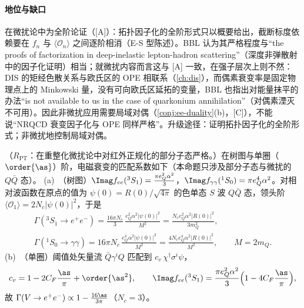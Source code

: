 \paragraph{地位与缺口}
在微扰论中为全阶论证（[A]）：拓扑因子化的全阶形式只以概要给出，截断标度依赖要在 $f_n$ 与 $\langle\mathcal O_n\rangle$ 之间逐阶相消（E-S 型陈述）。BBL 认为其严格程度与“the proofs of factorization in deep-inelastic lepton-hadron scattering”（深度非弹散射中的因子化证明）相当\cite[第~VI.A~节]{BodwinBraatenLepage1995}；就微扰内容而言这与 [A] 一致，在强子层次上则不然：DIS 的矩经色散关系与欧氏区的 OPE 相联系（\cref{ch:dis}），而偶素衰变率是固定物理点上的 Minkowski 量，没有可向欧氏区延拓的变量，BBL 也指出对能量抹平的办法“is not available to us in the case of quarkonium annihilation”（对偶素湮灭不可用）\cite[第~II.E~节]{BodwinBraatenLepage1995}。因此非微扰应用需要局域对偶（\cref{conj:ee-duality}(b)，[C]），不能说“NRQCD 衰变因子化与 OPE 同样严格”。升级途径：证明拓扑因子化的全阶形式；非微扰地控制局域对偶。

\begin{proposition}\label{prop:heavy-nrqcd-matching}
（$R_{\mathrm{PT}}$：在重整化微扰论中对红外正规化的部分子态严格。）在树图与单圈（$\order{\as}$）阶，电磁衰变的匹配系数如下（本命题只涉及部分子态与微扰的 $Q\bar Q$ 态）。
(a)~（树图）$\Imag f_{ee}({}^3S_1)=\frac{\pi e_Q^2\alpha^2}{3}$，$\Imag f_{\gamma\gamma}({}^1S_0)=\pi e_Q^4\alpha^2$。对相对波函数在原点的值为 $\psi(0)=R(0)/\sqrt{4\pi}$ 的色单态 $S$ 波 $Q\bar Q$ 态，领头阶 $\langle\mathcal O_1\rangle=2N_c|\psi(0)|^2$，于是
\begin{equation}\label{eq:heavy-EMwidths}
\begin{gathered}
\Gamma({}^3S_1\to e^+e^-)=\frac{16\pi N_c}{3}\,\frac{e_Q^2\alpha^2|\psi(0)|^2}{M^2}=\frac{N_ce_Q^2\alpha^2|R(0)|^2}{3m_Q^2},\\
\Gamma({}^1S_0\to\gamma\gamma)=16\pi N_c\,\frac{e_Q^4\alpha^2|\psi(0)|^2}{M^2}=\frac{4N_ce_Q^4\alpha^2|R(0)|^2}{M^2},\qquad M=2m_Q .
\end{gathered}
\end{equation}
(b)~（单圈）阈值处矢量流 $\bar Q\gamma^iQ$ 匹配到 $c_v\,\chi^\dagger\sigma^i\psi$，
\begin{equation}\label{eq:heavy-cv}
c_v=1-2C_F\frac{\as}{\pi}+\order{\as^2},\qquad
\Imag f_{ee}({}^3S_1)=\frac{\pi e_Q^2\alpha^2}{3}\Big(1-4C_F\frac{\as}{\pi}\Big),
\end{equation}
故 $\Gamma(V\to e^+e^-)\propto1-\frac{16\as}{3\pi}$（$N_c=3$）。
\end{proposition}

